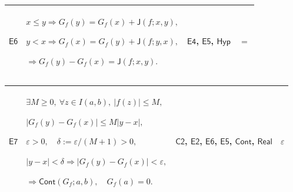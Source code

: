 \documentclass[11pt]{amsart}
\newlength{\FTCFourColumnBody}
\begin{document}
{\begin{tabular}
\end{tabular}%
\par\setlength{\parskip}{0pt}\nointerlineskip
\noindent
\begin{tabular}{|@{}>{\centering\arraybackslash}m{0.078431\FTCFourColumnBody}|>{\centering\arraybackslash}m{0.535947\FTCFourColumnBody}|>{\centering\arraybackslash}m{0.281045\FTCFourColumnBody}|>{\centering\arraybackslash}m{0.104575\FTCFourColumnBody}|}\hline
\hypertarget{proof:E6}{$\displaystyle \textsf{E6}$} & $\displaystyle x\le y\Rightarrow G_f(y)=G_f(x)+\textsf{J}(f;x,y),$\par
$\displaystyle y<x\Rightarrow G_f(x)=G_f(y)+\textsf{J}(f;y,x),$\par
$\displaystyle \Rightarrow G_f(y)-G_f(x)=\textsf{J}(f;x,y).$ & \hyperlink{proof:E4}{$\displaystyle \textsf{E4}$}, \hyperlink{proof:E5}{$\displaystyle \textsf{E5}$}, \hyperlink{def:Hyp}{$\displaystyle \textsf{Hyp}$} & $\displaystyle =$\\ \hline
\end{tabular}%
\par\setlength{\parskip}{0pt}\nointerlineskip
\noindent
\begin{tabular}{|@{}>{\centering\arraybackslash}m{0.078431\FTCFourColumnBody}|>{\centering\arraybackslash}m{0.535947\FTCFourColumnBody}|>{\centering\arraybackslash}m{0.281045\FTCFourColumnBody}|>{\centering\arraybackslash}m{0.104575\FTCFourColumnBody}|}\hline
\hypertarget{proof:E7}{$\displaystyle \textsf{E7}$} & $\displaystyle \exists M\ge0,\ \forall z\in I(a,b),\ |f(z)|\le M,$\par
$\displaystyle |G_f(y)-G_f(x)|\le M|y-x|,$\par
$\displaystyle \varepsilon>0,\quad\delta:=\varepsilon/(M+1)>0,$\par
$\displaystyle |y-x|<\delta\Rightarrow|G_f(y)-G_f(x)|<\varepsilon,$\par
$\displaystyle \Rightarrow\textsf{Cont}(G_f;a,b),\quad G_f(a)=0.$ & \hyperlink{proof:C2}{$\displaystyle \textsf{C2}$}, \hyperlink{proof:E2}{$\displaystyle \textsf{E2}$}, \hyperlink{proof:E6}{$\displaystyle \textsf{E6}$}, \hyperlink{proof:E5}{$\displaystyle \textsf{E5}$}, \hyperlink{def:Cont}{$\displaystyle \textsf{Cont}$}, \hyperlink{ax:Real}{$\displaystyle \textsf{Real}$} & $\displaystyle \varepsilon$\\ \hline
\end{tabular}%
\par
}
\end{document}
